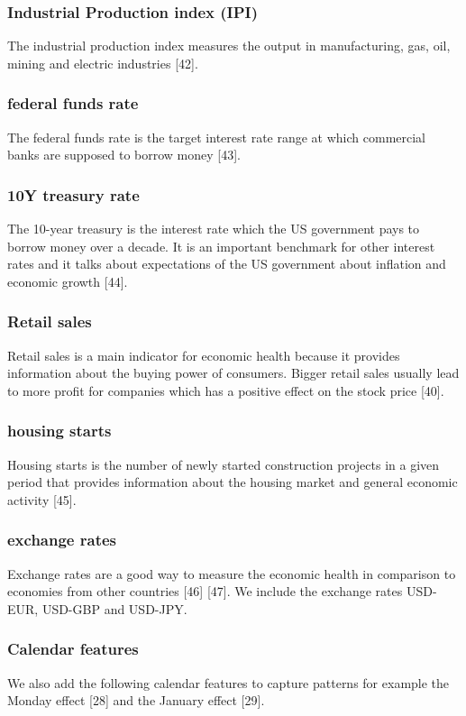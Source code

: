 \documentclass[a4paper,12pt]{report}
\begin{document}
			\subsubsection{Industrial Production index (IPI)}
			The industrial production index measures the output in manufacturing, gas, oil, mining and electric industries [42].
			\subsubsection{federal funds rate}
			The federal funds rate is the target interest rate range at which commercial banks are supposed to borrow money [43].
			\subsubsection{10Y treasury rate}
			The 10-year treasury is the interest rate which the US government pays to borrow money over a decade. It is an important benchmark for other interest rates and it talks about expectations of the US government about inflation and economic growth [44].
			\subsubsection{Retail sales}
			Retail sales is a main indicator for economic health because it provides information about the buying power of consumers. Bigger retail sales usually lead to more profit for companies which has a positive effect on the stock price [40]. 
			\subsubsection{housing starts}
			Housing starts is the number of newly started construction projects in a given period that provides information about the housing market and general economic activity [45]. 
			\subsubsection{exchange rates}
Exchange rates are a good way to measure the economic health in comparison to economies from other countries [46] [47]. We include the exchange rates USD-EUR, USD-GBP and USD-JPY.
		\subsubsection{Calendar features}
We also add the following calendar features to capture patterns for example the Monday effect [28] and the January effect [29].
\end{document}
